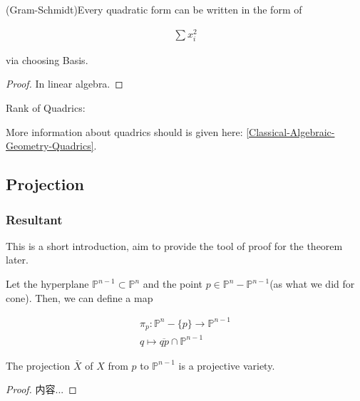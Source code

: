 \documentclass[Total.tex]{subfiles}
\begin{document}
		\begin{proposition}
			(Gram-Schmidt)Every quadratic form can be written in the form of 
			
			\begin{gather*}
				\sum x_i^2
			\end{gather*} 
			
			via choosing Basis.
		\end{proposition}
		
		\begin{proof}
			In linear algebra.
		\end{proof}
		
		Rank of Quadrics: 
		
		More information about quadrics should is given here: \ref{Classical-Algebraic-Geometry-Quadrics}.
		
		
		\subsection{Projection}
		
		\subsubsection{Resultant}
		
		This is a short introduction, aim to provide the tool of proof for the theorem later.
		
		
		\begin{example}
			\begin{Def}
				Let the hyperplane $\mathbb{P}^{n-1}\subset \mathbb{P}^n$ and the point $p\in \mathbb{P}^n-\mathbb{P}^{n-1}$(as what we did for cone). Then, we can define a map
				
				\begin{gather*}
					\pi_p:\mathbb{P}^n-\{p\}\rightarrow \mathbb{P}^{n-1}\\
					q\mapsto \overline{qp}\cap \mathbb{P}^{n-1}
				\end{gather*}
			\end{Def}
			
			\begin{theorem}
				The projection $\bar{X}$ of $X$ from $p$ to $\mathbb{P}^{n-1}$ is a projective variety.
			\end{theorem}
			
			\begin{proof}
				内容...
			\end{proof}
			
		\end{example}
		
\end{document}
